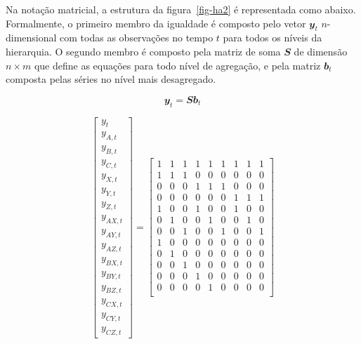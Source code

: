 \documentclass[
  12pt,
  letterpaper,
  DIV=11,
  numbers=noendperiod]{scrartcl}
\begin{document}
Na notação matricial, a estrutura da figura~\ref{fig-ha2} é representada
como abaixo. Formalmente, o primeiro membro da igualdade é composto pelo
vetor \(\mathbfit{y}_t\) \(n\)-dimensional com todas as observações no
tempo \(t\) para todos os níveis da hierarquia. O segundo membro é
composto pela matriz de soma \(\mathbfit{S}\) de dimensão \(n \times m\)
que define as equações para todo nível de agregação, e pela matriz
\(\mathbfit{b}_t\) composta pelas séries no nível mais desagregado.

\[
\mathbfit{y}_t=\mathbfit{Sb}_t
\]

\[
\begin{bmatrix}
    y_{t} \\
    y_{A, t} \\
    y_{B, t} \\
    y_{C, t} \\
    y_{X, t} \\
    y_{Y, t} \\
    y_{Z, t} \\
    y_{AX, t} \\
    y_{AY, t} \\
    y_{AZ, t} \\
    y_{BX, t} \\
    y_{BY, t} \\
    y_{BZ, t} \\
    y_{CX, t} \\
    y_{CY, t} \\
    y_{CZ, t}
\end{bmatrix}
=
\begin{bmatrix}
    1 & 1 & 1 & 1 & 1 & 1 & 1 & 1 & 1 \\
    1 & 1 & 1 & 0 & 0 & 0 & 0 & 0 & 0 \\
    0 & 0 & 0 & 1 & 1 & 1 & 0 & 0 & 0 \\
    0 & 0 & 0 & 0 & 0 & 0 & 1 & 1 & 1 \\
    1 & 0 & 0 & 1 & 0 & 0 & 1 & 0 & 0 \\
    0 & 1 & 0 & 0 & 1 & 0 & 0 & 1 & 0 \\
    0 & 0 & 1 & 0 & 0 & 1 & 0 & 0 & 1 \\
    1 & 0 & 0 & 0 & 0 & 0 & 0 & 0 & 0 \\
    0 & 1 & 0 & 0 & 0 & 0 & 0 & 0 & 0 \\
    0 & 0 & 1 & 0 & 0 & 0 & 0 & 0 & 0 \\
    0 & 0 & 0 & 1 & 0 & 0 & 0 & 0 & 0 \\
    0 & 0 & 0 & 0 & 1 & 0 & 0 & 0 & 0 \\

\end{bmatrix}\]
\end{document}
